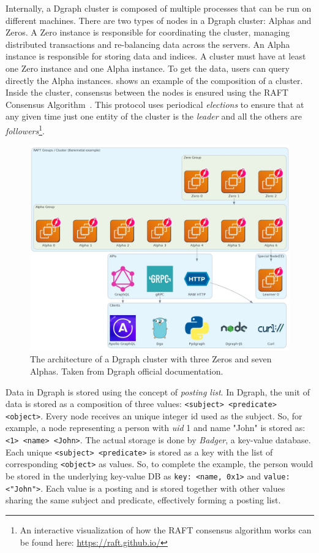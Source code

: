 Internally, a Dgraph cluster is composed of multiple processes that can be run on different machines. There are two types of nodes in a Dgraph cluster: Alphas and Zeros. A Zero instance is responsible for coordinating the cluster, managing distributed transactions and re-balancing data across the servers. An Alpha instance is responsible for storing data and indices. A cluster must have at least one Zero instance and one Alpha instance. To get the data, users can query directly the Alpha instances.  shows an example of the composition of a cluster. Inside the cluster, consensus between the nodes is ensured using the RAFT Consensus Algorithm~\cite{raft}. This protocol uses periodical {\it elections} to ensure that at any given time just one entity of the cluster is the {\it leader} and all the others are {\it followers}\footnote{An interactive visualization of how the RAFT consensus algorithm works can be found here: \url{https://raft.github.io/}}.

\begin{figure}[!ht]
    \centering
    \includegraphics[width=1\textwidth]{Figures/background/dgraph-architecture.jpg}
    \caption{The architecture of a Dgraph cluster with three Zeros and seven Alphas. Taken from Dgraph official documentation.}
    \label{fig:dgraph-architecture}
\end{figure}

Data in Dgraph is stored using the concept of \textit{posting list}. In Dgraph, the unit of data is stored as a composition of three values: \lstinline{<subject> <predicate> <object>}. Every node receives an unique integer id used as the subject. So, for example, a node representing a person with \textit{uid} 1 and name "John" is stored as: \lstinline{<1> <name> <John>}. The actual storage is done by \textit{Badger}, a key-value database. Each unique \lstinline{<subject> <predicate>} is stored as a key with the list of corresponding \lstinline{<object>} as values. So, to complete the example, the person would be stored in the underlying key-value DB as \lstinline{key: <name, 0x1>} and \lstinline{value: <"John">}. Each value is a posting and is stored together with other values sharing the same subject and predicate, effectively forming a posting list.

